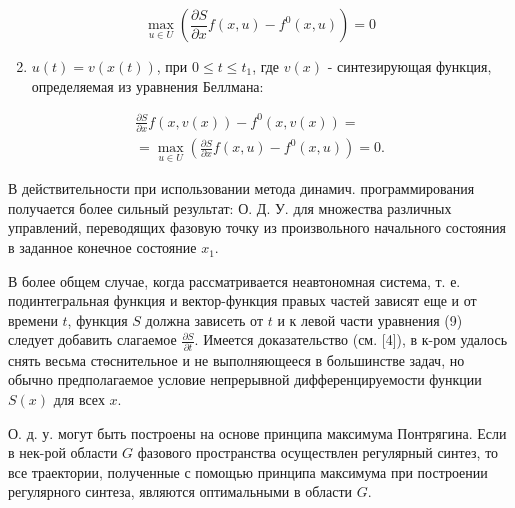 \documentclass[10pt]{article}
\begin{document}
\[

\max _{u \in U}\left(\frac{\partial S}{\partial x} f(x, u)-f^{0}(x, u)\right)=0

\]



\begin{enumerate}

  \setcounter{enumi}{1}

  \item $u(t)=v(x(t))$, при $0 \leqslant t \leqslant t_{1}$, где $v(x)$ - синтезирующая функция, определяемая из уравнения Беллмана:

\end{enumerate}



\[

\begin{gathered}

\frac{\partial S}{\partial x} f(x, v(x))-f^{0}(x, v(x))= \\

=\max _{u \in U}\left(\frac{\partial S}{\partial x} f(x, u)-f^{0}(x, u)\right)=0 .

\end{gathered}

\]



В действительности при использовании метода динамич. программирования получается более сильный результат: О. Д. У. для множества различных управлений, переводящих фазовую точку из произвольного начального состояния в заданное конечное состояние $x_{1}$.



В более общем случае, когда рассматривается неавтономная система, т. е. подинтегральная функция и вектор-функция правых частей зависят еще и от времени $t$, функция $S$ должна зависеть от $t$ и к левой части уравнения (9) следует добавить слагаемое $\frac{\partial S}{\partial t}$. Имеется доказательство (см. [4]), в к-ром удалось снять весьма стөснительное и не выполняющееся в большинстве задач, но обычно предполагаемое условие непрерывной дифференцируемости функции $S(x)$ для всех $x$.



О. д. у. могут быть построены на основе принципа максимума Понтрягина. Если в нек-рой области $G$ фазового пространства осуществлен регулярный синтез, то все траектории, полученные с помощью принципа максимума при построении регулярного синтеза, являются оптимальными в области $G$.
\end{document}
